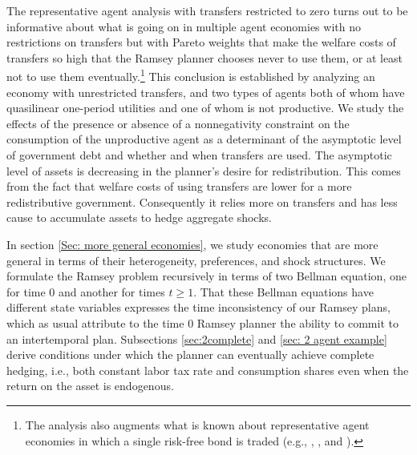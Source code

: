\documentclass[thmsb,11pt]{article}
\begin{document}
 The representative agent analysis with transfers restricted to zero
  turns out to be   informative about what is going on in multiple agent economies with no restrictions on transfers but with Pareto weights that make
     the welfare  costs of transfers so  high that the Ramsey planner chooses never to use them, or at least not to use them
     eventually.\footnote{The analysis
also  augments what is known about representative agent economies in which a single  risk-free bond is traded (e.g., \citet{Aiyagari2002}, \citet{Farhi2010},
and \citet{Faraglia2011}).}
This conclusion is established by analyzing an economy with  unrestricted transfers, and two types of agents both of whom
 have quasilinear one-period utilities and one of whom is not productive. We study the effects of the presence or absence of  a nonnegativity constraint on the consumption of the unproductive agent as a determinant of the asymptotic level of government debt and  whether and when transfers are used.
The asymptotic level of assets is decreasing in the planner's desire for redistribution.
This comes from the fact that welfare costs of using transfers are lower for a more redistributive government.
Consequently it relies more on transfers and has less cause to accumulate assets to hedge aggregate shocks.



%
%
%

 In section \ref{Sec: more general economies},
we study economies that are more general in terms of their  heterogeneity, preferences, and shock structures.  We formulate the Ramsey problem recursively in terms of two Bellman equation,
one for time $0$ and another for times $t\geq 1$.  That these Bellman equations have different state variables expresses the time inconsistency
of our Ramsey plans, which as usual attribute to the time $0$ Ramsey planner the ability to commit to an intertemporal plan.
Subsections \ref{sec:2complete} and \ref{sec: 2 agent example}   derive conditions under which the planner can eventually
achieve complete hedging, i.e., both constant labor tax rate and consumption shares even when the return on the asset is endogenous.
\end{document}
